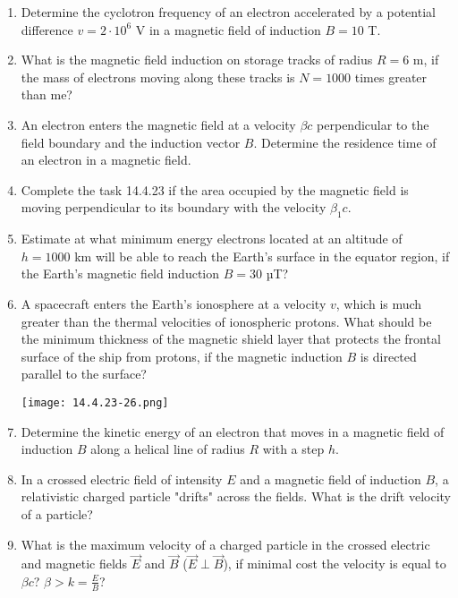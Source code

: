 \documentclass{article}
\begin{document}
\begin{enumerate}[label=14.4.\arabic*]
\item Determine the cyclotron frequency of an electron accelerated by a potential difference $v = 2 \cdot 10^6$ V in a magnetic field of induction $B = 10$ T.

\item What is the magnetic field induction on storage tracks of radius $R = 6$ m, if the mass of electrons moving along these tracks is $N = 1000$ times greater than me?

\item An electron enters the magnetic field at a velocity $\beta c$ perpendicular to the field boundary and the induction vector $B$. Determine the residence time of an electron in a magnetic field.

\item Complete the task 14.4.23 if the area occupied by the magnetic field is moving perpendicular to its boundary with the velocity $\beta_1 c$.

\item Estimate at what minimum energy electrons located at an altitude of $h = 1000$ km will be able to reach the Earth's surface in the equator region, if the Earth's magnetic field induction $B = 30$ µT?

\item A spacecraft enters the Earth's ionosphere at a velocity $v$, which is much greater than the thermal velocities of ionospheric protons. What should be the minimum thickness of the magnetic shield layer that protects the frontal surface of the ship from protons, if the magnetic induction $B$ is directed parallel to the surface?

\begin{center}
    \texttt{[image: 14.4.23-26.png]}
\end{center}

\item Determine the kinetic energy of an electron that moves in a magnetic field of induction $B$ along a helical line of radius $R$ with a step $h$.

\item In a crossed electric field of intensity $E$ and a magnetic field of induction $B$, a relativistic charged particle "drifts" across the fields. What is the drift velocity of a particle?

\item What is the maximum velocity of a charged particle in the crossed electric and magnetic fields $\overrightarrow{E}$ and $\overrightarrow{B}$ ($\overrightarrow{E} \perp \overrightarrow{B} $), if minimal cost the velocity is equal to $\beta c$? $\beta > k = \frac{E}{B}$?


\end{enumerate}
\end{document}
